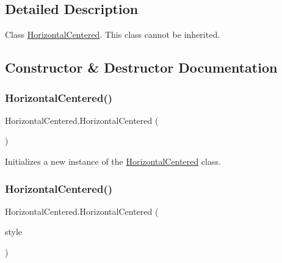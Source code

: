 \subsection{Detailed Description}
Class \hyperlink{class_horizontal_centered}{Horizontal\+Centered}. This class cannot be inherited. 



\subsection{Constructor \& Destructor Documentation}
\mbox{\label{class_horizontal_centered_a2739867182ed848a075d5a5878ba1638}} 
\subsubsection{\texorpdfstring{Horizontal\+Centered()}{HorizontalCentered()}\hspace{0.1cm}{\footnotesize\ttfamily [1/2]}}
{\footnotesize\ttfamily Horizontal\+Centered.\+Horizontal\+Centered (\begin{DoxyParamCaption}{ }\end{DoxyParamCaption})\hspace{0.3cm}{\ttfamily [inline]}}



Initializes a new instance of the \hyperlink{class_horizontal_centered}{Horizontal\+Centered} class. 

\mbox{\label{class_horizontal_centered_a45e944344beec9d95e42d604bc9b9771}} 
\subsubsection{\texorpdfstring{Horizontal\+Centered()}{HorizontalCentered()}\hspace{0.1cm}{\footnotesize\ttfamily [2/2]}}
{\footnotesize\ttfamily Horizontal\+Centered.\+Horizontal\+Centered (\begin{DoxyParamCaption}\item[{G\+U\+I\+Style}]{style }\end{DoxyParamCaption})\hspace{0.3cm}{\ttfamily [inline]}}



